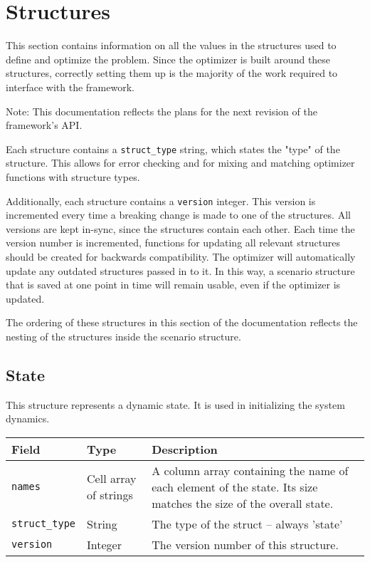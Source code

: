 \documentclass{article}
\begin{document}
	\section{Structures}
		This section contains information on all the values in the structures used to define and optimize the problem.
		Since the optimizer is built around these structures, correctly setting them up is the majority of the work required to
		interface with the framework.

		Note: This documentation reflects the plans for the next revision of the framework's API.

		Each structure contains a \lstinline|struct_type| string, which states the "type" of the structure.
		This allows for error checking and for mixing and matching optimizer functions with structure types.

		Additionally, each structure contains a \lstinline|version| integer. This version is incremented every time a breaking
		change is made to one of the structures. All versions are kept in-sync, since the structures contain each other.
		Each time the version number is incremented, functions for updating all relevant structures should be created for backwards
		compatibility. The optimizer will automatically update any outdated structures passed in to it. In this way, a scenario structure
		that is saved at one point in time will remain usable, even if the optimizer is updated.

		The ordering of these structures in this section of the documentation reflects the nesting of the structures inside the scenario structure.

		\subsection{State}
			\label{sec:state} %

			This structure represents a dynamic state. It is used in initializing the system dynamics.

			\vspace{\baselineskip}

			\begin{tabular}{ p{} | p{} | p{}}
				Field                    & Type    & Description                                                                       \\ \hline
				\lstinline|names|        & \raggedright Cell array of strings & A column array containing the name of each element of
				                                                   the state. Its size matches the size of the overall state.          \\[1ex]
				\lstinline|struct_type|  & String  & The type of the struct -- always 'state'                                          \\
				\lstinline|version|      & Integer & The version number of this structure.                                             \\
			\end{tabular}
\end{document}
